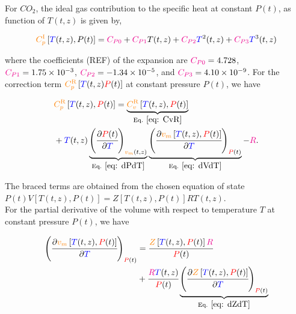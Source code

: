 \documentclass[../Article_Model_Parameters.tex]{subfiles}
\begin{document}
	For $CO_2$, the ideal gas contribution to the specific heat at constant $P(t)$, as function of $T(t,z)$ is given by,
	
	{\footnotesize
	\begin{equation}
		{\color{orange}C_p^{\text{I}}}\left[{\color{blue}T}(t,z),P(t)\right] = {\color{magenta}C_{P0}} + {\color{magenta}C_{P1}}T(t,z) + {\color{magenta}C_{P2}}{\color{blue}T}^2(t,z) + {\color{magenta}C_{P3}}{\color{blue}T}^3(t,z) \label{eq: Cp_I}
	\end{equation} }

	where the coefficients ({\color{red}REF}) of the expansion are ${\color{magenta}C_{P0}} = 4.728$, ${\color{magenta}C_{P1}} = 1.75 \times 10^{-3}$, ${\color{magenta}C_{P2}} = -1.34 \times 10^{-5}$, and ${\color{magenta}C_{P3}} = 4.10 \times 10^{-9}$. For the correction term ${\color{orange}C_p^{\text{R}}}\left[{\color{blue}T}(t,z){\color{red}P}(t)\right]$ at constant pressure $P(t)$, we have
	
	{\footnotesize	
	\begin{align}
		&{\color{orange}C_p^{\text{R}}}\left[{\color{blue}T}(t,z), {\color{red}P}(t)\right] = \underbrace{{\color{orange}C_v^{\text{R}}}\left[{\color{blue}T}(t,z), {\color{red}P}(t)\right]}_{\text{Eq. }\eqref{eq: CvR}} \nonumber \\
		&+ {\color{blue}T}(t,z) \underbrace{\left(\cfrac{\partial {\color{red}P}(t)}{\partial {\color{blue}T}}\right)_{{\color{orange}v_m}(t,z)}}_{\text{Eq. } \eqref{eq: dPdT}} \underbrace{\left(\cfrac{\partial {\color{orange}v_m}\left[{\color{blue}T}(t,z),{\color{red}P}(t)\right]}{\partial {\color{blue}T}}\right)_{{\color{red}P}(t)}}_{\text{Eq. } \eqref{eq: dVdT}} - {\color{magenta}R}. \label{eq: Cp_R} 
	\end{align} }

	The braced terms are obtained from the chosen equation of state $P(t) V\left[T(t,z),P(t)\right] = Z\left[T(t,z),P(t)\right] R T(t,z)$. \\
	
	For the partial derivative of the volume with respect to temperature $T$ at constant pressure $P(t)$, we have

	{\footnotesize
	\begin{align}
		\left( \cfrac{\partial {\color{orange}v_m}\left[{\color{blue}T}(t,z), {\color{red}P}(t)\right]}{\partial {\color{blue}T}} \right)_{{\color{red}P}(t)} &= \cfrac{{\color{orange}Z}\left[{\color{blue}T}(t,z), {\color{red}P}(t)\right] {\color{magenta}R}}{{\color{red}P}(t)} \nonumber \\
		&+ \cfrac{{\color{magenta}R}{\color{blue}T}(t,z)}{{\color{red}P}(t)} \underbrace{\left( \cfrac{\partial {\color{orange}Z}\left[{\color{blue}T}(t,z), {\color{red}P}(t)\right]}{\partial {\color{blue}T}} \right)_{{\color{red}P}(t)}}_{\text{Eq. }\eqref{eq: dZdT}} \label{eq: dVdT}
	\end{align} }
 
\end{document}
